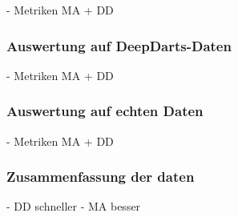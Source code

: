 - Metriken MA + DD

\todo{}

\subsubsection{Auswertung auf DeepDarts-Daten}

- Metriken MA + DD

\todo{}

\subsubsection{Auswertung auf echten Daten}

- Metriken MA + DD

\todo{}

\subsubsection{Zusammenfassung der daten}

- DD schneller
- MA besser

\todo{}
